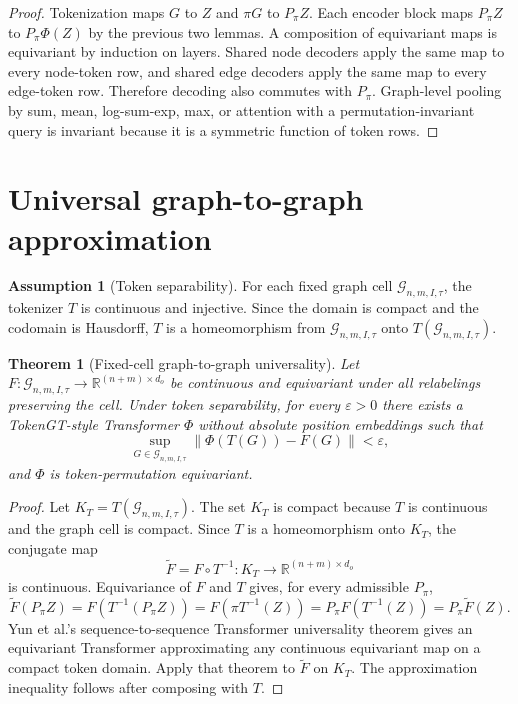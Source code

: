 \documentclass[11pt]{article}
\theoremstyle{definition}
\newtheorem{assumption}[definition]{Assumption}
\theoremstyle{plain}
\newtheorem{theorem}[definition]{Theorem}
\theoremstyle{remark}
\numberwithin{equation}{section}
\newcommand{\R}{\mathbb{R}}
\newcommand{\G}{\mathcal{G}}
\newcommand{\norm}[1]{\left\lVert #1\right\rVert}
\begin{document}
\begin{proof}
Tokenization maps $G$ to $Z$ and $\pi G$ to $P_\pi Z$.  Each encoder block maps $P_\pi Z$ to $P_\pi \Phi(Z)$ by the previous two lemmas.  A composition of equivariant maps is equivariant by induction on layers.  Shared node decoders apply the same map to every node-token row, and shared edge decoders apply the same map to every edge-token row.  Therefore decoding also commutes with $P_\pi$.  Graph-level pooling by sum, mean, log-sum-exp, max, or attention with a permutation-invariant query is invariant because it is a symmetric function of token rows.
\end{proof}

\section{Universal graph-to-graph approximation}

\begin{assumption}[Token separability]
For each fixed graph cell $\G_{n,m,I,\tau}$, the tokenizer $T$ is continuous and injective.  Since the domain is compact and the codomain is Hausdorff, $T$ is a homeomorphism from $\G_{n,m,I,\tau}$ onto $T(\G_{n,m,I,\tau})$.
\end{assumption}

\begin{theorem}[Fixed-cell graph-to-graph universality]
Let $F:\G_{n,m,I,\tau}\to\R^{(n+m)\times d_o}$ be continuous and equivariant under all relabelings preserving the cell.  Under token separability, for every $\varepsilon>0$ there exists a TokenGT-style Transformer $\Phi$ without absolute position embeddings such that
\begin{equation}
  \sup_{G\in\G_{n,m,I,\tau}}\norm{\Phi(T(G))-F(G)}<\varepsilon,
\end{equation}
and $\Phi$ is token-permutation equivariant.
\end{theorem}

\begin{proof}
Let $K_T=T(\G_{n,m,I,\tau})$.  The set $K_T$ is compact because $T$ is continuous and the graph cell is compact.  Since $T$ is a homeomorphism onto $K_T$, the conjugate map
\begin{equation}
  \widetilde F=F\circ T^{-1}:K_T\to\R^{(n+m)\times d_o}
\end{equation}
is continuous.  Equivariance of $F$ and $T$ gives, for every admissible $P_\pi$,
\begin{equation}
  \widetilde F(P_\pi Z)=F(T^{-1}(P_\pi Z))=F(\pi T^{-1}(Z))=P_\pi F(T^{-1}(Z))=P_\pi\widetilde F(Z).
\end{equation}
Yun et al.'s sequence-to-sequence Transformer universality theorem gives an equivariant Transformer approximating any continuous equivariant map on a compact token domain.  Apply that theorem to $\widetilde F$ on $K_T$.  The approximation inequality follows after composing with $T$.
\end{proof}
\end{document}
